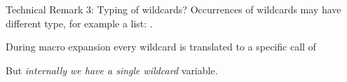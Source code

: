 \documentclass[aspectratio=169
  , xcolor={svgnames}
  , hyperref=
      { colorlinks
      , urlcolor=DarkBlue
      }
  , russian  %
  ]{beamer}
\begin{document}

\begin{frame}{Technical Remark 3: Typing of wildcards?}
	Occurrences of wildcards may have different type, for example a list: .

	During macro expansion every wildcard is translated to a specific call of 
	\begin{center}


		\begin{minipage}{\linewidth}
			\ExpandWC
		\end{minipage}
	\end{center}

	But \emph{internally we have a single wildcard} variable.
\end{frame}
\end{document}
